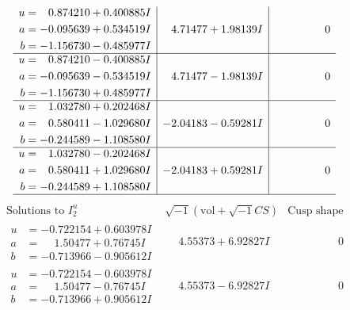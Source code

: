 \documentclass[1p]{elsarticle_modified}
\theoremstyle{definition}
\newcommand{\I}{\sqrt{-1}}
\begin{document}
$$\begin{array}{c|c|c}
\begin{aligned}
u &= \phantom{-}0.874210 + 0.400885 I \\
a &= -0.095639 + 0.534519 I \\
b &= -1.156730 - 0.485977 I\end{aligned}
 & \phantom{-}4.71477 + 1.98139 I & \phantom{-0.000000 } 0 \\ \hline\begin{aligned}
u &= \phantom{-}0.874210 - 0.400885 I \\
a &= -0.095639 - 0.534519 I \\
b &= -1.156730 + 0.485977 I\end{aligned}
 & \phantom{-}4.71477 - 1.98139 I & \phantom{-0.000000 } 0 \\ \hline\begin{aligned}
u &= \phantom{-}1.032780 + 0.202468 I \\
a &= \phantom{-}0.580411 - 1.029680 I \\
b &= -0.244589 - 1.108580 I\end{aligned}
 & -2.04183 - 0.59281 I & \phantom{-0.000000 } 0 \\ \hline\begin{aligned}
u &= \phantom{-}1.032780 - 0.202468 I \\
a &= \phantom{-}0.580411 + 1.029680 I \\
b &= -0.244589 + 1.108580 I\end{aligned}
 & -2.04183 + 0.59281 I & \phantom{-0.000000 } 0\\
 \hline 
 \end{array}$$\newpage$$\begin{array}{c|c|c}  
\text{Solutions to }I^u_{2}& \I (\text{vol} + \sqrt{-1}CS) & \text{Cusp shape}\\
 \hline 
\begin{aligned}
u &= -0.722154 + 0.603978 I \\
a &= \phantom{-}1.50477 + 0.76745 I \\
b &= -0.713966 - 0.905612 I\end{aligned}
 & \phantom{-}4.55373 + 6.92827 I & \phantom{-0.000000 } 0 \\ \hline\begin{aligned}
u &= -0.722154 - 0.603978 I \\
a &= \phantom{-}1.50477 - 0.76745 I \\
b &= -0.713966 + 0.905612 I\end{aligned}
 & \phantom{-}4.55373 - 6.92827 I & \phantom{-0.000000 } 0 \\ \hline\begin{aligned}

\end{aligned}
\end{array}$$
\end{document}
